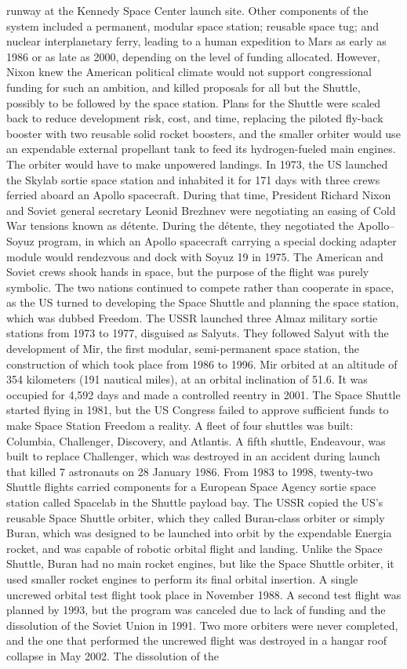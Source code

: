 \documentclass[12pt]{article}
\begin{document}
runway at the Kennedy Space Center launch site. Other components of the system included a permanent, modular space station; reusable space tug; and nuclear interplanetary ferry, leading to a human expedition to Mars as early as 1986 or as late as 2000, depending on the level of funding allocated. However, Nixon knew the American political climate would not support congressional funding for such an ambition, and killed proposals for all but the Shuttle, possibly to be followed by the space station. Plans for the Shuttle were scaled back to reduce development risk, cost, and time, replacing the piloted fly-back booster with two reusable solid rocket boosters, and the smaller orbiter would use an expendable external propellant tank to feed its hydrogen-fueled main engines. The orbiter would have to make unpowered landings. In 1973, the US launched the Skylab sortie space station and inhabited it for 171 days with three crews ferried aboard an Apollo spacecraft. During that time, President Richard Nixon and Soviet general secretary Leonid Brezhnev were negotiating an easing of Cold War tensions known as détente. During the détente, they negotiated the Apollo–Soyuz program, in which an Apollo spacecraft carrying a special docking adapter module would rendezvous and dock with Soyuz 19 in 1975. The American and Soviet crews shook hands in space, but the purpose of the flight was purely symbolic. The two nations continued to compete rather than cooperate in space, as the US turned to developing the Space Shuttle and planning the space station, which was dubbed Freedom. The USSR launched three Almaz military sortie stations from 1973 to 1977, disguised as Salyuts. They followed Salyut with the development of Mir, the first modular, semi-permanent space station, the construction of which took place from 1986 to 1996. Mir orbited at an altitude of 354 kilometers (191 nautical miles), at an orbital inclination of 51.6. It was occupied for 4,592 days and made a controlled reentry in 2001. The Space Shuttle started flying in 1981, but the US Congress failed to approve sufficient funds to make Space Station Freedom a reality. A fleet of four shuttles was built: Columbia, Challenger, Discovery, and Atlantis. A fifth shuttle, Endeavour, was built to replace Challenger, which was destroyed in an accident during launch that killed 7 astronauts on 28 January 1986. From 1983 to 1998, twenty-two Shuttle flights carried components for a European Space Agency sortie space station called Spacelab in the Shuttle payload bay. The USSR copied the US's reusable Space Shuttle orbiter, which they called Buran-class orbiter or simply Buran, which was designed to be launched into orbit by the expendable Energia rocket, and was capable of robotic orbital flight and landing. Unlike the Space Shuttle, Buran had no main rocket engines, but like the Space Shuttle orbiter, it used smaller rocket engines to perform its final orbital insertion. A single uncrewed orbital test flight took place in November 1988. A second test flight was planned by 1993, but the program was canceled due to lack of funding and the dissolution of the Soviet Union in 1991. Two more orbiters were never completed, and the one that performed the uncrewed flight was destroyed in a hangar roof collapse in May 2002. The dissolution of the 
\end{document}
